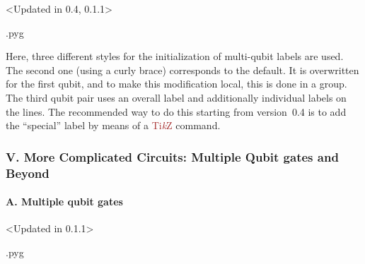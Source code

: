 \documentclass{scrartcl}
\makeatletter
\newenvironment{codeexample}{%
   \VerbatimEnvironment%
   \let\FVB@VerbatimOut\minted@FVB@VerbatimOut
   \let\FVE@VerbatimOut\minted@FVE@VerbatimOut
   \minted@configlang{tex}%
   \minted@fvset
   \begin{VerbatimOut}[codes={\catcode`\^^I=12},firstline,lastline]{\minted@jobname.pyg}%
}{
   \end{VerbatimOut}%
   \minted@langlinenoson%
   \savebox\codeexamplebox{ \minted@jobname.pyg}%
   \ifdim\wd\codeexamplebox>\dimexpr.5\linewidth-3mm\relax%
      \wd\codeexamplebox=.5\linewidth%
   \else%
      \wd\codeexamplebox=\dimexpr\wd\codeexamplebox+3mm\relax%
   \fi%
   \noindent\begin{minipage}{\wd\codeexamplebox}%
      \centering%
      \usebox\codeexamplebox%
   \end{minipage}%
   \begin{minipage}{\dimexpr\linewidth-\wd\codeexamplebox\relax}%
      \expandafter\minted@pygmentize\expandafter{\minted@lang}%
   \end{minipage}%
   \minted@langlinenosoff%
   \par%
}
\def\TikZ{\textcolor{brown}{Ti\textit kZ}}
\makeatother
\begin{document}
               \begin{example}<Updated in 0.4, 0.1.1>
                  \begin{codeexample}
                  \end{codeexample}
                  Here, three different styles for the initialization of multi\hyp qubit labels are used.
                  The second one (using a curly brace) corresponds to the default.
                  It is overwritten for the first qubit, and to make this modification local, this is done in a group.
                  The third qubit pair uses an overall label and additionally individual labels on the lines.
                  The recommended way to do this starting from version~0.4 is to add the ``special'' label by means of a \TikZ{} command.
               \end{example}

         \subsubsection{V. More Complicated Circuits: Multiple Qubit gates and Beyond}
            \paragraph{A. Multiple qubit gates}\leavevmode
               \begin{example}<Updated in 0.1.1>
                  \begin{codeexample}
                  \end{codeexample}
               \end{example}
\end{document}
